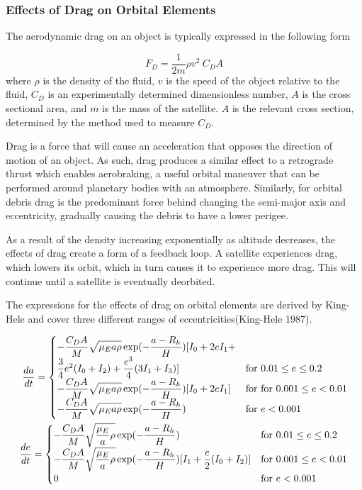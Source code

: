 \documentclass{article}
\begin{document}
\subsubsection{Effects of Drag on Orbital Elements}

The aerodynamic drag on an object is typically expressed in the following form

\begin{equation}
	F_D = \frac{1}{2m} \rho v^2 \: C_D A
\end{equation}
where $\rho$ is the density of the fluid, $v$ is the speed of the object relative to the fluid, $C_D$ is an experimentally determined dimensionless number, $A$ is the cross sectional area, and $m$ is the mass of the satellite. $A$ is the relevant cross section, determined by the method used to measure $C_D$. 

Drag is a force that will cause an acceleration that opposes the direction of motion of an object. As such, drag produces a similar effect to a retrograde thrust which enables aerobraking, a useful orbital maneuver that can be performed around planetary bodies with an atmosphere. Similarly, for orbital debris drag is the predominant force behind changing the semi-major axis and eccentricity, gradually causing the debris to have a lower perigee. 

As a result of the density increasing exponentially as altitude decreases, the effects of drag create a form of a feedback loop. A satellite experiences drag, which lowers its orbit, which in turn causes it to experience more drag. This will continue until a satellite is eventually deorbited. 

The expressions for the effects of drag on orbital elements are derived by King-Hele and cover three different ranges of eccentricities(King-Hele 1987).

\begin{align}
		\dfrac{da}{dt} = \begin{cases}
			-\dfrac{C_D A}{M} \sqrt{\mathstrut\mu_E a \rho} \exp(-\dfrac{a - R_h}{H})[I_0 
			+ 2eI_1 + \\ \dfrac{3}{4}e^2(I_0 + I_2) + \dfrac{e^3}{4}(3I_1 +I_3)] & \text{for } 0.01 \leq e \leq 0.2 \\
			-\dfrac{C_D A}{M} \sqrt{\mathstrut\mu_E a \rho}\exp(-\dfrac{a - R_h}{H})[I_0 + 2eI_1 ] & \text{for } \text{for } 0.001 \leq e < 0.01\\
			-\dfrac{C_D A}{M} \sqrt{\mathstrut\mu_E a \rho}\exp(-\dfrac{a - R_h}{H}) & \text{for } e < 0.001
		\end{cases}\\
		\newline
		\dfrac{de}{dt} = \begin{cases}
			-\dfrac{C_D A}{M} \sqrt{\mathstrut\dfrac{\mu_E}{a} \rho}\exp(-\dfrac{a - R_h}{H}) & \text{for } 0.01 \leq e \leq 0.2  \\
			-\dfrac{C_D A}{M} \sqrt{\mathstrut\dfrac{\mu_E}{a} \rho}\exp(-\dfrac{a - R_h}{H})[I_1 + \dfrac{e}{2}(I_0 + I_2)] & \text{for } 0.001 \leq e < 0.01\\
			0 & \text{for } e < 0.001
		\end{cases}
	\end{align}
\end{document}
